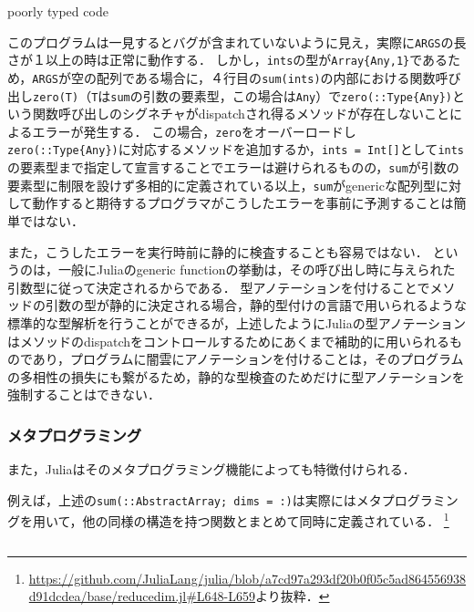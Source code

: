 \begin{listing}[ht]
  \inputminted[frame=lines]{julia}{src/parse_sum.jl}
  \caption{poorly typed code}
  \label{lst:target1}
\end{listing}

このプログラムは一見するとバグが含まれていないように見え，実際に\texttt{ARGS}の長さが１以上の時は正常に動作する．
しかし，\texttt{ints}の型が\texttt{Array\{Any,1\}}であるため，\texttt{ARGS}が空の配列である場合に，４行目の\texttt{sum(ints)}の内部における関数呼び出し\texttt{zero(T)}（\texttt{T}は\texttt{sum}の引数の要素型，この場合は\texttt{Any}）で\texttt{zero(::Type\{Any\})}という関数呼び出しのシグネチャがdispatchされ得るメソッドが存在しないことによるエラーが発生する．
この場合，\texttt{zero}をオーバーロードし\texttt{zero(::Type\{Any\})}に対応するメソッドを追加するか，\texttt{ints = Int[]}として\texttt{ints}の要素型まで指定して宣言することでエラーは避けられるものの，\texttt{sum}が引数の要素型に制限を設けず多相的に定義されている以上，\texttt{sum}がgenericな配列型に対して動作すると期待するプログラマがこうしたエラーを事前に予測することは簡単ではない．

また，こうしたエラーを実行時前に静的に検査することも容易ではない．
というのは，一般にJuliaのgeneric functionの挙動は，その呼び出し時に与えられた引数型に従って決定されるからである．
型アノテーションを付けることでメソッドの引数の型が静的に決定される場合，静的型付けの言語で用いられるような標準的な型解析を行うことができるが，上述したようにJuliaの型アノテーションはメソッドのdispatchをコントロールするためにあくまで補助的に用いられるものであり，プログラムに闇雲にアノテーションを付けることは，そのプログラムの多相性の損失にも繋がるため，静的な型検査のためだけに型アノテーションを強制することはできない．

\subsubsection{メタプログラミング}

また，Juliaはそのメタプログラミング機能によっても特徴付けられる．

例えば，上述の\texttt{sum(::AbstractArray; dims = :)}は実際にはメタプログラミングを用いて，他の同様の構造を持つ関数とまとめて同時に定義されている．
\footnote{
  \url{https://github.com/JuliaLang/julia/blob/a7cd97a293df20b0f05c5ad864556938d91dcdea/base/reducedim.jl\#L648-L659}より抜粋．
}

\inputminted[frame=lines, firstline=3, lastline=12, breaklines]{julia}{src/sums_def.jl}

